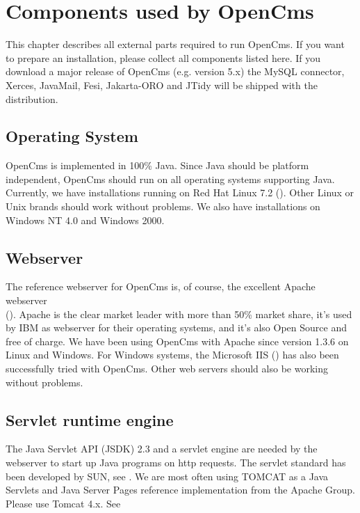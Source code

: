 \chapter{Components used by OpenCms}
\label{components}

This chapter describes all external parts required to run OpenCms.
If you want to prepare an installation, please collect all
components listed here. If you download a major release of OpenCms
(e.g. version 5.x) the MySQL connector, Xerces, JavaMail, Fesi, 
Jakarta-ORO and JTidy will be shipped with the distribution.

\section{Operating System}
OpenCms is implemented in 100\% Java. Since Java should be platform independent, OpenCms should run
on all operating systems supporting Java. Currently, we have installations running on
Red Hat Linux 7.2 (). Other
Linux or Unix brands should work without problems. We also have installations on
Windows NT 4.0 and Windows 2000.

\section{Webserver}
The reference webserver for OpenCms is, of course, the excellent Apache webserver \\
().
Apache is the clear market leader with more than 50\% market share,
it's used by IBM as webserver for their operating systems, and it's also Open Source and
free of charge. We have been using OpenCms with Apache since version 1.3.6 on Linux and Windows.
For Windows systems, the Microsoft IIS ()
has also been successfully tried with OpenCms. Other web servers should also be working without problems.

\section{Servlet runtime engine}
The Java Servlet API (JSDK) 2.3 and a servlet engine are needed by
the webserver to start up Java programs on http requests. The
servlet standard has been developed by SUN, see
.
We are most often using TOMCAT as a Java Servlets and Java Server
Pages reference implementation from the Apache Group. Please use
Tomcat 4.x. See

